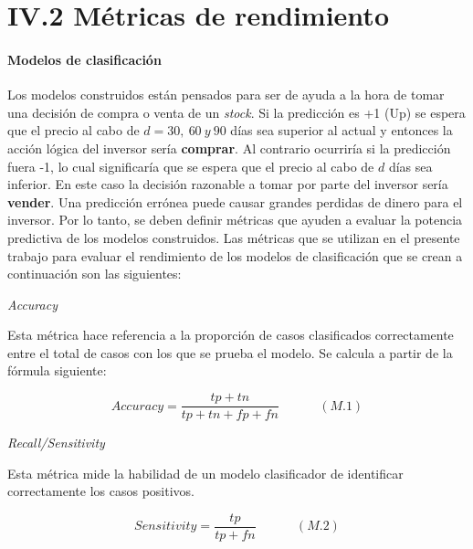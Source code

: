 \documentclass[]{DissertateUSU}
\let\oldparagraph\paragraph
\renewcommand{\paragraph}[1]{\oldparagraph{#1}\mbox{}}
\begin{document}
\setlength\parskip{8ex}

\FloatBarrier
{}
\fancyfoot[C]{\thepage}

\section{IV.2 \textbf{Métricas de rendimiento}}

\justifying

\hypertarget{modelos-de-clasificacion}{%
\paragraph{Modelos de clasificación}\label{modelos-de-clasificacion}}

\setlength\parskip{6ex}

\noindent Los modelos construidos están pensados para ser de ayuda a la
hora de tomar una decisión de compra o venta de un \emph{stock}. Si la
predicción es +1 (Up) se espera que el precio al cabo de
\(d=30, \ 60 \ y \ 90\) días sea superior al actual y entonces la acción
lógica del inversor sería \textbf{comprar}. Al contrario ocurriría si la
predicción fuera -1, lo cual significaría que se espera que el precio al
cabo de \(d\) días sea inferior. En este caso la decisión razonable a
tomar por parte del inversor sería \textbf{vender}. Una predicción
errónea puede causar grandes perdidas de dinero para el inversor. Por lo
tanto, se deben definir métricas que ayuden a evaluar la potencia
predictiva de los modelos construidos. Las métricas que se utilizan en
el presente trabajo para evaluar el rendimiento de los modelos de
clasificación que se crean a continuación son las siguientes:

\setlength\parskip{9ex}

\emph{Accuracy}

\noindent Esta métrica hace referencia a la proporción de casos
clasificados correctamente entre el total de casos con los que se prueba
el modelo. Se calcula a partir de la fórmula siguiente:

\[Accuracy = \frac{tp+tn}{tp+tn+fp+fn} \ \ \ \ \ \ \ \ \ \ \ \ \ \ (M.1)\]

\emph{Recall/Sensitivity}

\noindent Esta métrica mide la habilidad de un modelo clasificador de
identificar correctamente los casos positivos.

\[Sensitivity = \frac{tp}{tp+fn} \ \ \ \ \ \ \ \ \ \ \ \ \ \ (M.2)\]
\end{document}
